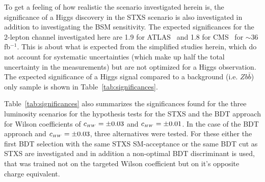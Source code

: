 To get a feeling of how realistic the scenario investigated herein is, the significance of a Higgs discovery in the STXS scenario is also investigated in addition to investigating the BSM sensitivity. The expected significances for the 2-lepton channel investigated here are 1.9 for ATLAS~\cite{Aaboud:2017xsd} and 1.8 for CMS~\cite{Sirunyan:2017elk} for $\sim$36 fb$^{-1}$. This is about what is expected from the simplified studies herein, which do not account for systematic uncertainties (which make up half the total uncertainty in the measurements) but are not optimized for a Higgs observation. The expected significance of a Higgs signal compared to a background (i.e. $Z b\bar{b}$) only sample is shown in Table~\ref{tab:significances}.

Table~\ref{tab:significances} also summarizes the significances found for the three luminosity scenarios for the hypothesis tests for the STXS and the BDT approach for Wilson coefficients of $c_{\scriptscriptstyle HW} = \pm0.03$ and $c_{\scriptscriptstyle HW} = \pm0.01$. In the case of the BDT approach and $c_{\scriptscriptstyle HW} = \pm0.03$, three alternatives were tested. For these either the first BDT selection with the same STXS SM-acceptance or the same BDT cut as STXS are investigated and in addition a non-optimal BDT discriminant is used, that was trained not on the targeted Wilson coefficient but on it's opposite charge equivalent. 


